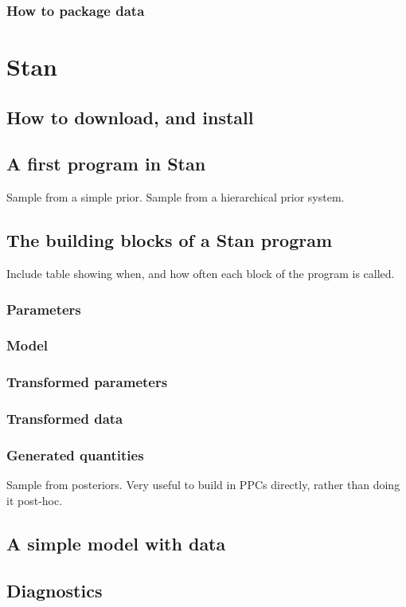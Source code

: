\documentclass[11pt,fullpage]{book}
\begin{document}
\subsubsection{How to package data}

\section{Stan}
\subsection{How to download, and install}
\subsection{A first program in Stan}
Sample from a simple prior. Sample from a hierarchical prior system.
\subsection{The building blocks of a Stan program}
Include table showing when, and how often each block of the program is called.
\subsubsection{Parameters}
\subsubsection{Model}
\subsubsection{Transformed parameters}
\subsubsection{Transformed data}
\subsubsection{Generated quantities}
Sample from posteriors. Very useful to build in PPCs directly, rather than doing it post-hoc.

\subsection{A simple model with data}

\subsection{Diagnostics}
\end{document}
